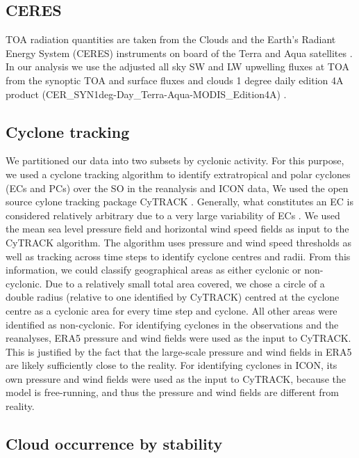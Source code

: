 \documentclass[12pt,a4paper]{article}
\begin{document}
\subsection{CERES}

TOA radiation quantities are taken from the Clouds and the Earth’s Radiant
Energy System (CERES) instruments on board of the Terra and Aqua satellites
\citep{wielicki1996,loeb2018}. In our analysis we use the adjusted all sky SW
and LW upwelling fluxes at TOA from the synoptic TOA and surface fluxes and
clouds 1 degree daily edition 4A product
(CER\_SYN1deg-Day\_Terra-Aqua-MODIS\_Edition4A)
\citep{doelling2013,doelling2016}.

\subsection{Cyclone tracking}

We partitioned our data into two subsets by cyclonic activity. For this
purpose, we used a cyclone tracking algorithm to identify extratropical and
polar cyclones (ECs and PCs) over the SO in the reanalysis and ICON data, We
used the open source cylone tracking package CyTRACK \citep{perez-alarcon2024}.
Generally, what constitutes an EC is considered relatively arbitrary due to a
very large variability of ECs \citep{neu2013}.  We used the mean sea level
pressure field and horizontal wind speed fields as input to the CyTRACK
algorithm. The algorithm uses pressure and wind speed thresholds as well as
tracking across time steps to identify cyclone centres and radii. From this
information, we could classify geographical areas as either cyclonic or
non-cyclonic. Due to a relatively small total area covered, we chose a circle
of a double radius (relative to one identified by CyTRACK) centred at the
cyclone centre as a cyclonic area for every time step and cyclone. All other
areas were identified as non-cyclonic. For identifying cyclones in the
observations and the reanalyses, ERA5 pressure and wind fields were used as the
input to CyTRACK.  This is justified by the fact that the large-scale pressure
and wind fields in ERA5 are likely sufficiently close to the reality. For
identifying cyclones in ICON, its own pressure and wind fields were used as the
input to CyTRACK, because the model is free-running, and thus the pressure and
wind fields are different from reality.

\subsection{Cloud occurrence by stability}
\end{document}
